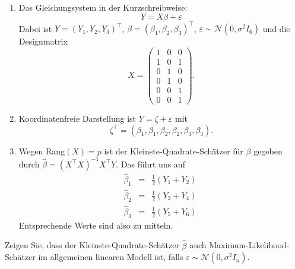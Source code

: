 \solution
\begin{enumerate}

    \item Das Gleichungsystem in der Kurzschreibweise:
        \begin{equation*}
            Y = X \beta + \varepsilon
        \end{equation*}
        Dabei ist $Y= \left( Y_1,Y_2,Y_3 \right)^\top$, $\beta = \left( \beta_1,\beta_2,\beta_3 \right)^\top$,
        $\varepsilon \sim\mathcal N\left( 0, \sigma^2 I_6 \right)$
        und die Designmatrix
        \begin{equation*}
            X = \left( {\begin{array}{ccc} 1&0&0\\ 1&0&1\\ 0&1&0\\ 0&1&0\\ 0&0&1\\ 0&0&1 \end{array}   } \right).
        \end{equation*}

    \item Koordinatenfreie Darstellung ist $Y = \zeta + \varepsilon$ mit 
        \begin{equation*}
            \zeta^\top = \left( \beta_1,\beta_1,\beta_2,\beta_2,\beta_3,\beta_3 \right).
        \end{equation*}

    \item Wegen Rang$(X)=p$ ist der Kleinste-Quadrate-Schätzer für $\beta$ gegeben durch 
        $\hat \beta = \left( X^\top X \right)^{-1} X^\top Y$. Das führt uns auf 
        \begin{eqnarray*}
            \hat\beta_1 &=&  \frac{1}{2} \left( Y_1+Y_2 \right)    \\
            \hat\beta_2 &=&  \frac{1}{2} \left( Y_3+Y_4 \right)    \\
            \hat\beta_3 &=&  \frac{1}{2} \left( Y_5+Y_6 \right).
        \end{eqnarray*}
        Entsprechende Werte sind also zu mitteln.

\end{enumerate}



Zeigen Sie, dass der Kleinste-Quadrate-Schätzer $\hat \beta$ auch Maximum-Likelihood-Schätzer 
im allgemeinen linearen Modell ist, falls $\varepsilon \sim \mathcal N(0, \sigma^2 I_n)$.


